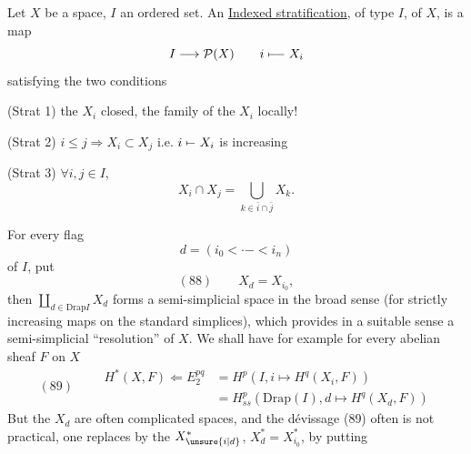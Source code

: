 
Let $X$ be a space, $I$ an ordered set.
An \uline{Indexed stratification}, of type $I$, of $X$, is a map
\[I\longrightarrow\mathcal P(X)\qquad i\mathrel{\mapstochar\relbar\joinrel\relbar}X_i\]
satisfying the two conditions

(Strat 1) the $X_i$ closed, the family of the $X_i$  locally! 

(Strat 2) $i\leq j\Longrightarrow X_i\subset X_j$ i.e. $i\mathrel{\mapstochar\relbar}X_i$ is increasing

(Strat 3) $\forall i,j\in I$, 
\[X_i\cap X_j=\bigcup_{k\in\bar i\cap\bar j}X_k.\]

For every flag
\[d=(i_0<\mathord{\cdot}\mathord{-}<i_n)\]
of $I$, put
\[(88)\qquad X_d=X_{i_0},\]
then  $\coprod_{d\in\mathrm{Drap}I}X_d$ forms a  semi-simplicial space  in the broad sense (for strictly increasing maps on the standard simplices), which provides in a suitable sense a semi-simplicial ``resolution'' of $X$. We shall have for example for every abelian sheaf $F$ on $X$
\[
(89)\qquad\begin{aligned}
H^*(X,F)\Longleftarrow E_2^{pq}&=H^p(I,i\mapsto H^q(X_i,F))\\
&=H^p_{ss}(\mathrm{Drap}(I),d\mapsto H^q(X_d,F))
\end{aligned}
\]
But the  $X_d$ are often complicated spaces, and the dévissage (89) often is not practical, one replaces by the $X_{\unsure{i|d}}^*$, $X_d^*=X_{i_0}^*$, by putting

